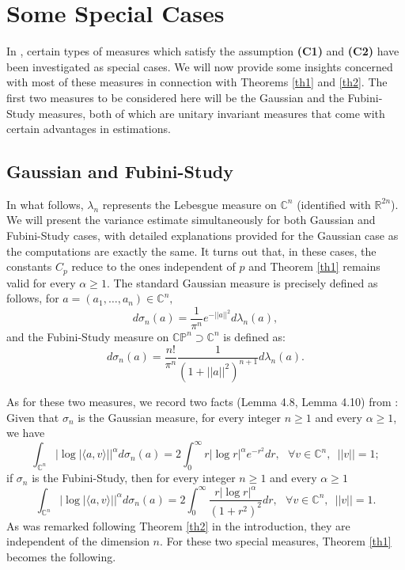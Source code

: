 \documentclass[11pt,leqno,oneside]{amsart}
\numberwithin{equation}{section}
\begin{document}
\section{Some Special Cases}\label{sec5}

 In \cite{BCM}, certain types of measures which satisfy the assumption \textbf{(C1)} and \textbf{(C2)} have been investigated as special cases. We will now provide some insights concerned with most of these measures in connection with Theorems \ref{th1} and \ref{th2}. The first two measures to be considered here will be the Gaussian and the Fubini-Study measures, both of which are unitary invariant measures that come with certain advantages in estimations.
 \subsection{Gaussian and Fubini-Study}In what follows, $\lambda_{n}$ represents the Lebesgue measure on $\mathbb{C}^{n}$ (identified with $\mathbb{R}^{2n}$). We will present the variance estimate simultaneously for both Gaussian and Fubini-Study cases, with detailed explanations provided for the Gaussian case as the computations are exactly the same. It turns out that, in these cases, the constants $C_{p}$ reduce to the ones independent of $p$ and Theorem \ref{th1} remains valid for every $\alpha \geq 1$. The standard Gaussian measure is precisely defined as follows, for $a=(a_{1}, \ldots, a_{n})\in \mathbb{C}^{n},$  \begin{equation} \label{gaussme}d\sigma_{n}(a)=\frac{1}{\pi^{n}}e^{-||a||^{2}}d\lambda_{n}(a),\end{equation}and the Fubini-Study measure on $\mathbb{C}\mathbb{P}^{n}\supset \mathbb{C}^{n}$  is defined as: \begin{equation}\label{fubstudy} d\sigma_{n}(a)=\frac{n!}{\pi^{n}}\frac{1}{(1+ ||a||^{2})^{n+1}}d\lambda_{n}(a).\end{equation}

  As for these two measures, we record two facts (Lemma 4.8, Lemma 4.10) from \cite{BCM}: Given that  $\sigma_{n}$ is the Gaussian measure, for every integer $n\geq 1$ and every $\alpha \geq 1$, we have \begin{equation}\label{gauss1}\int_{\mathbb{C}^{n}}{|\log{|\langle a, v \rangle|}|}^{\alpha}d\sigma_{n}(a)= 2 \int_{0}^{\infty}{r|\log{r}|^{\alpha} e^{-r^{2}} dr}, \,\,\,\,\forall v\in \mathbb{C}^{n},\,\,\,||v||=1;\end{equation} if $\sigma_{n}$ is the Fubini-Study, then for every integer $n \geq 1$ and every $\alpha \geq 1$ \begin{equation}\label{gauss2}\int_{\mathbb{C}^{n}}{|\log{|\langle a, v \rangle|}|}^{\alpha}d\sigma_{n}(a)= 2\int_{0}^{\infty}{\frac{r|\log{r}|^{\alpha}}{(1+r^{2})^{2}}dr}, \,\,\,\,\forall v\in \mathbb{C}^{n},\,\,\,||v||=1.\end{equation}As was remarked following Theorem \ref{th2} in the introduction, they are independent of the dimension $n$. For these two special measures, Theorem \ref{th1} becomes the following.
\end{document}
